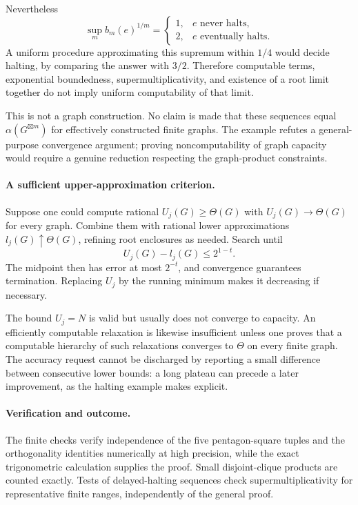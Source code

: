 \documentclass[11pt]{article}
\begin{document}
Nevertheless
\[
 \sup_m b_m(e)^{1/m}
 =\begin{cases}1,&e\text{ never halts},\\2,&e\text{ eventually halts}.\end{cases}
\]
A uniform procedure approximating this supremum within $1/4$ would decide halting, by comparing the answer with $3/2$. Therefore computable terms, exponential boundedness, supermultiplicativity, and existence of a root limit together do not imply uniform computability of that limit.

This is not a graph construction. No claim is made that these sequences equal $\alpha(G^{\boxtimes m})$ for effectively constructed finite graphs. The example refutes a general-purpose convergence argument; proving noncomputability of graph capacity would require a genuine reduction respecting the graph-product constraints.

\paragraph{A sufficient upper-approximation criterion.}
Suppose one could compute rational $U_j(G)\ge\Theta(G)$ with $U_j(G)\to\Theta(G)$ for every graph. Combine them with rational lower approximations $l_j(G)\uparrow\Theta(G)$, refining root enclosures as needed. Search until
\[
 U_j(G)-l_j(G)\le2^{1-t}.
\]
The midpoint then has error at most $2^{-t}$, and convergence guarantees termination. Replacing $U_j$ by the running minimum makes it decreasing if necessary.

The bound $U_j=N$ is valid but usually does not converge to capacity. An efficiently computable relaxation is likewise insufficient unless one proves that a computable hierarchy of such relaxations converges to $\Theta$ on every finite graph. The accuracy request cannot be discharged by reporting a small difference between consecutive lower bounds: a long plateau can precede a later improvement, as the halting example makes explicit.

\paragraph{Verification and outcome.}
The finite checks verify independence of the five pentagon-square tuples and the orthogonality identities numerically at high precision, while the exact trigonometric calculation supplies the proof. Small disjoint-clique products are counted exactly. Tests of delayed-halting sequences check supermultiplicativity for representative finite ranges, independently of the general proof.
\end{document}
